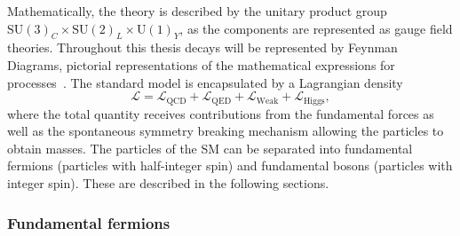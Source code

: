 Mathematically, the theory is described by the unitary product group $\text{SU}(3)_{C}\times\text{SU}(2)_{L}\times\text{U}(1)_{Y}$, as the components are represented as gauge field theories. Throughout this thesis decays will be represented by Feynman Diagrams, pictorial representations of the mathematical expressions for processes~\cite{PhysRev.76.749}.  
The standard model is encapsulated by a Lagrangian density
\begin{equation}
\mathcal{L} = \mathcal{L}_{\text{QCD}}+\mathcal{L}_{\text{QED}}+\mathcal{L}_{\text{Weak}}+\mathcal{L}_{\text{Higgs}},
\end{equation}
where the total quantity receives contributions from the fundamental forces as well as the spontaneous symmetry breaking mechanism allowing the particles to obtain masses. 
The particles of the SM can be separated into fundamental fermions (particles with half-integer spin) and fundamental bosons (particles with integer spin). These are described in the following sections.  


\subsubsection{Fundamental fermions}

